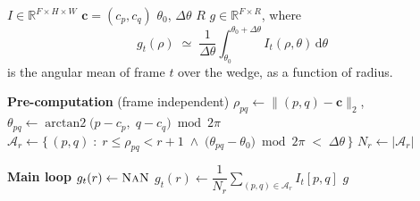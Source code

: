 \clearpage
\begin{algorithm}[H]
\caption{Discrete radial profile (angular average over a wedge)}
\label{alg:rad_int}
\begin{algorithmic}[1]
 
\Require $I \in \mathbb{R}^{F \times H \times W}$ 
\Require $\mathbf{c} = (c_p, c_q)$ 
\Require $\theta_0$, $\Delta\theta$ 
\Require $R$ 
\Ensure  $g \in \mathbb{R}^{F \times R}$, where
    \[
        g_t(\rho) \;\simeq\; \frac{1}{\Delta\theta}
        \int_{\theta_0}^{\theta_0 + \Delta\theta} I_t(\rho, \theta)\, \mathrm{d}\theta
    \]
    is the angular mean of frame $t$ over the wedge, as a function of radius.
\Statex
 
\Statex \textbf{Pre-computation} (frame independent)
\State $\rho_{pq} \gets \big\| (p,q) - \mathbf{c} \big\|_2$, \quad
       $\theta_{pq} \gets \operatorname{arctan2}\big(p - c_p,\; q - c_q\big) \bmod 2\pi$
\Statex
{} 
    \State $\mathcal{A}_r \gets \big\{\, (p,q) \;:\;
        r \le \rho_{pq} < r+1
        \;\wedge\;
        \big(\theta_{pq} - \theta_0\big) \bmod 2\pi \;<\; \Delta\theta \,\big\}$
    \State $N_r \gets |\mathcal{A}_r|$ 
\EndFor
\Statex
 
\Statex \textbf{Main loop}
            \State $g_t(r) \gets \textsc{NaN}$ 
        \Else
            \State $g_t(r) \gets \dfrac{1}{N_r} \displaystyle\sum_{(p,q) \in \mathcal{A}_r} I_t[p,q]$
        \EndIf
    \EndFor
\EndFor
\Statex
\State \Return $g$
 
\end{algorithmic}
\end{algorithm}




